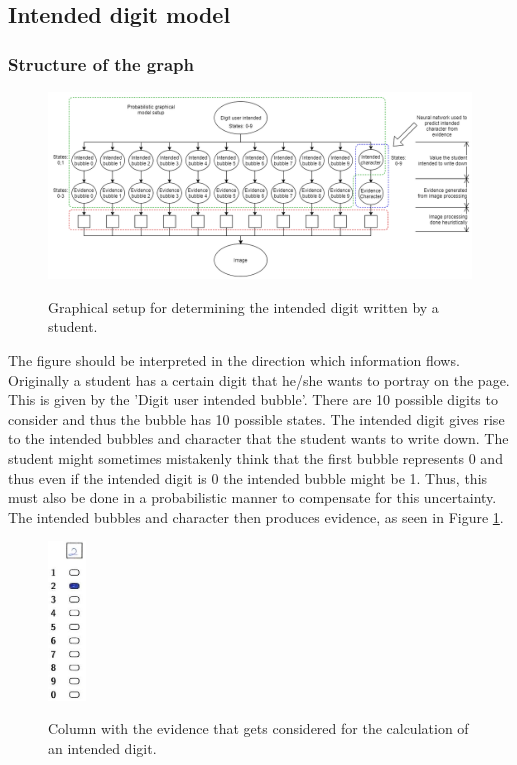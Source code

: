 \subsection{Intended digit model}

\subsubsection{Structure of the graph}


\begin{figure}
  \centering
  \includegraphics[width=16cm]{pgmDigit}\\
  \caption{Graphical setup for determining the intended digit written by a student.}
  \label{fig:pgmDigit}
\end{figure}


The figure should be interpreted in the direction which information flows. Originally a student has a certain digit that he/she wants to portray on the page. This is given by the 'Digit user intended bubble'. There are 10 possible digits to consider and thus the bubble has 10 possible states. The intended digit gives rise to the intended bubbles and character that the student wants to write down. The student might sometimes mistakenly think that the first bubble represents 0 and thus even if the intended digit is 0 the intended bubble might be 1. Thus, this must also be done in a probabilistic manner to compensate for this uncertainty. The intended bubbles and character then produces evidence, as seen in Figure \ref{fig:pgmDigit}.  

\begin{figure}
  \centering
  \includegraphics[width=1cm]{column}\\
  \caption{Column with the evidence that gets considered for the calculation of an intended digit.}
  \label{fig:column}
\end{figure}

